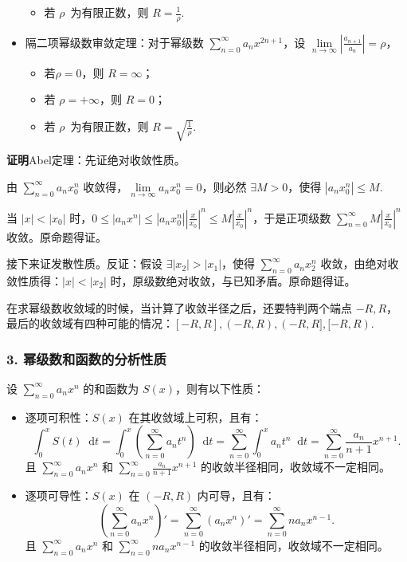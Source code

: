 \documentclass[b5paper]{ctexart}
\renewcommand{\d}{\mathop{}\!\mathrm{d}}
\newcommand{\mjst}{\sum \limits_{n = 0}^{\infty}}
\newcommand \jx[3]{\lim\limits_{#1 \to #2} #3}
\begin{document}
\begin{itemize}
\begin{itemize}
				\item 若 $\rho  \enspace \mbox{为有限正数}$，则 $R = \frac{1}{\rho}$.
			\end{itemize}
			
		\item 隔二项幂级数审敛定理：对于幂级数 $\mjst a_nx^{2n + 1}$，设 $\jx{n}{\infty}{|\frac{a_{n + 1}}{a_n}|} = \rho$，
			\begin{itemize}
				\item 若$\rho = 0$，则 $R = \infty$；
				
				\item 若 $\rho = +\infty$，则 $R = 0$；
				
				\item 若 $\rho  \enspace \mbox{为有限正数}$，则 $R = \sqrt{\frac{1}{\rho}}$.
			\end{itemize}
		
		\end{itemize}

	\textbf{证明}Abel定理：先证绝对收敛性质。
	
	由 $\mjst a_n x_0^n$ 收敛得，$\jx{n}{\infty}{a_nx_0^n} = 0$，则必然 $\exists M > 0$，使得 $|a_n x_0^n| \le M$.
	
	当 $|x| < |x_0|$ 时，$0 \le |a_nx^n| \le |a_nx_0^n| |\frac{x}{x_0}|^n \le M |\frac{x}{x_0}|^n$，于是正项级数 $\mjst M|\frac{x}{x_0}|^n$ 收敛。原命题得证。
	
	接下来证发散性质。反证：假设 $\exists |x_2| > |x_1|$，使得 $\mjst a_n x_2^n$ 收敛，由绝对收敛性质得：$|x| < |x_2|$ 时，原级数绝对收敛，与已知矛盾。原命题得证。
	
	在求幂级数收敛域的时候，当计算了收敛半径之后，还要特判两个端点 $-R, R$，最后的收敛域有四种可能的情况：$[-R, R], (-R, R), (-R, R], [-R, R)$.
	
	\subsubsection*{3. 幂级数和函数的分析性质}
	
	设 $\mjst a_n x^n$ 的和函数为 $S(x)$，则有以下性质：
	
	\begin{itemize}
		\item 逐项可积性：$S(x)$ 在其收敛域上可积，且有：
		\begin{equation*}
			\int_{0}^{x} S(t) \d t = \int_{0}^{x} (\mjst a_n t^n) \d t = \mjst \int_{0}^{x} a_n t^n \d t = \mjst \frac{a_n}{n + 1} x^{n + 1}.
		\end{equation*}
		 且 $\mjst a_n x^n$ 和 $\mjst \frac{a_n}{n + 1} x^{n + 1}$ 的收敛半径相同，收敛域不一定相同。
		 
		\item 逐项可导性：$S(x)$ 在 $(-R, R)$ 内可导，且有：
		\begin{equation}
			(\mjst a_nx^n)' = \mjst (a_nx^n)' = \mjst na_n x^{n - 1}.
		\end{equation}
		且 $\mjst a_n x^n$ 和 $\mjst na_nx^{n - 1}$ 的收敛半径相同，收敛域不一定相同。
	\end{itemize}
	
\end{document}
